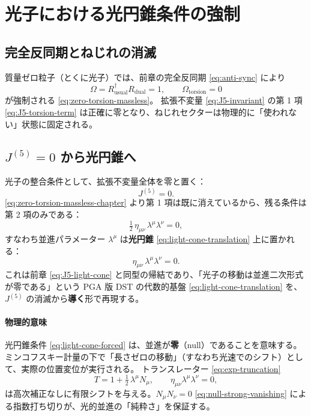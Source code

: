 \documentclass[dvipdfmx,a4paper,oneside]{jsbook}
\numberwithin{equation}{chapter}
\begin{document}
\section{光子における光円錐条件の強制}

\subsection{完全反同期とねじれの消滅}

質量ゼロ粒子（とくに光子）では、前章の完全反同期 \eqref{eq:anti-sync} により
\begin{equation}
  \Omega = R_{\mathrm{usual}}^\dagger R_{\mathrm{dual}} = 1,
  \qquad
  \Omega_{\mathrm{torsion}} = 0
  \label{eq:zero-torsion-massless-chapter}
\end{equation}
が強制される \eqref{eq:zero-torsion-massless}。
拡張不変量 \eqref{eq:J5-invariant} の第 1 項 \eqref{eq:J5-torsion-term} は正確に零となり、ねじれセクターは物理的に「使われない」状態に固定される。

\subsection{\texorpdfstring{\(J^{(5)} = 0\) から光円錐へ}{J5 = 0 から光円錐へ}}

光子の整合条件として、拡張不変量全体を零と置く：
\begin{equation}
  J^{(5)} = 0.
  \label{eq:J5-massless-zero}
\end{equation}
\eqref{eq:zero-torsion-massless-chapter} より第 1 項は既に消えているから、残る条件は第 2 項のみである：
\begin{equation}
  \tfrac{1}{2}\,\eta_{\mu\nu}\,\lambda^\mu\lambda^\nu = 0,
  \label{eq:J5-light-cone-chapter}
\end{equation}
すなわち並進パラメーター \(\lambda^\mu\) は\textbf{光円錐} \eqref{eq:light-cone-translation} 上に置かれる：
\begin{equation}
  \eta_{\mu\nu}\,\lambda^\mu\lambda^\nu = 0.
  \label{eq:light-cone-forced}
\end{equation}
これは前章 \eqref{eq:J5-light-cone} と同型の帰結であり、「光子の移動は並進二次形式が零である」という PGA 版 DST の代数的基盤 \eqref{eq:light-cone-translation} を、\(J^{(5)}\) の消滅から\textbf{導く}形で再現する。

\paragraph{物理的意味}
光円錐条件 \eqref{eq:light-cone-forced} は、並進が\textbf{零}（null）であることを意味する。
ミンコフスキー計量の下で「長さゼロの移動」（すなわち光速でのシフト）として、実際の位置変位が実行される。
トランスレーター \eqref{eq:exp-truncation}
\begin{equation}
  T = 1 + \tfrac{1}{2}\,\lambda^\mu N_\mu,
  \qquad
  \eta_{\mu\nu}\lambda^\mu\lambda^\nu = 0,
  \label{eq:translator-lightlike}
\end{equation}
は高次補正なしに有限シフトを与える。\(N_\mu N_\nu = 0\) \eqref{eq:null-strong-vanishing} による指数打ち切りが、光的並進の「純粋さ」を保証する。
\end{document}
